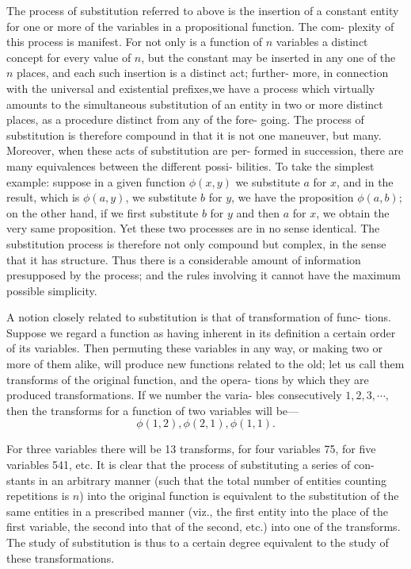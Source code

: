 \documentclass[9pt, twoside]{extarticle}
\begin{document}
The process of substitution referred to above is the insertion of a constant
entity for one or more of the variables in a propositional function. The com-
plexity of this process is manifest. For not only is a function of \(n\) variables
a distinct concept for every value of \(n\), but the constant may be inserted in
any one of the \(n\) places, and each such insertion is a distinct act; further-
more, in connection with the universal and existential prefixes,we have a
process which virtually amounts to the simultaneous substitution of an entity
in two or more distinct places, as a procedure distinct from any of the fore-
going. The process of substitution is therefore compound in that it is not
one maneuver, but many. Moreover, when these acts of substitution are per-
formed in succession, there are many equivalences between the different possi-
bilities. To take the simplest example: suppose in a given function \(\phi(x, y)\)
we substitute \(a\) for \(x\), and in the result, which is \(\phi(a, y)\), we substitute \(b\) for \(y\),
 we have the proposition \(\phi(a, b)\); on the other hand, if we first substitute \(b\)
for \(y\) and then \(a\) for \(x\), we obtain the very same proposition. Yet these two
processes are in no sense identical. The substitution process is therefore not
only compound but complex, in the sense that it has structure. Thus there
is a considerable amount of information presupposed by the process; and
the rules involving it cannot have the maximum possible simplicity.

A notion closely related to substitution is that of transformation of func-
tions. Suppose we regard a function as having inherent in its definition a
certain order of its variables. Then permuting these variables in any way,
or making two or more of them alike, will produce new functions related to
the old; let us call them transforms of the original function, and the opera-
tions by which they are produced transformations. If we number the varia-
bles consecutively \(1, 2, 3, \cdots,\) then the transforms for a function of two
variables will be---
\[\phi(1, 2), \phi(2, 1), \phi(1, 1).\]

For three variables there will be 13 transforms, for four variables 75, for five
variables 541, etc. It is clear that the process of substituting a series of con-
stants in an arbitrary manner (such that the total number of entities counting
repetitions is \(n\)) into the original function is equivalent to the substitution of
the same entities in a prescribed manner (viz., the first entity into the place
of the first variable, the second into that of the second, etc.) into one of the
transforms. The study of substitution is thus to a certain degree equivalent
to the study of these transformations.
\end{document}

